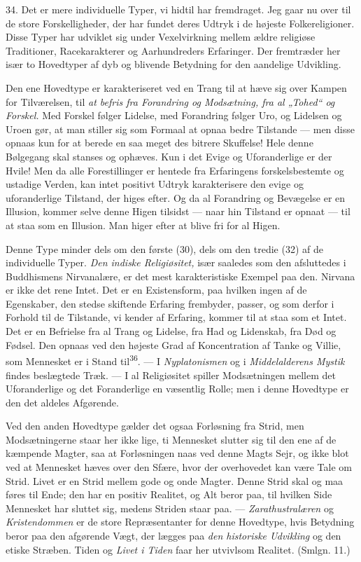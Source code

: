 \documentclass[12pt,a4paper,openany]{book}
\newcommand{\opage}[1]{\marginnote{\footnotesize\textit{[#1]}}}
\begin{document}
34. Det er mere individuelle Typer, vi hidtil har fremdraget. Jeg gaar
nu over til de store Forskelligheder, der har fundet deres Udtryk i de
højeste Folkereligioner. Disse Typer har udviklet sig under
Vexelvirkning mellem ældre religiøse Traditioner, Racekarakterer og
Aarhundreders Erfaringer. Der fremtræder her især to Hovedtyper af dyb
og blivende Betydning for den aandelige Udvikling.

Den ene Hovedtype er karakteriseret ved en Trang til at hæve sig over
Kampen for Tilværelsen, til \textit{at befris fra Forandring og
Modsætning, fra al „Tohed“ og Forskel.} Med Forskel følger Lidelse, med
Forandring følger Uro, og Lidelsen og Uroen gør, at man stiller sig som
Formaal at opnaa bedre Tilstande --- men disse opnaas kun for at berede
en saa meget des bitrere Skuffelse! Hele denne Bølgegang skal stanses og
ophæves. Kun i det Evige og Uforanderlige er der Hvile! Men da alle
Forestillinger er hentede fra Erfaringens forskelsbestemte og ustadige
Verden, kan intet positivt Udtryk karakterisere den evige og
uforanderlige Tilstand, der higes efter. Og da al Forandring og
Bevægelse er en Illusion, kommer selve denne Higen tilsidst --- naar hin
Tilstand er opnaat --- til at staa som en Illusion. Man higer efter at
blive fri for al Higen.

Denne Type minder dels om den første (30), dels om den tredie (32) af de
individuelle Typer. \textit{Den indiske Religiøsitet,} især saaledes som
den afsluttedes i Buddhismens Nirvanalære, er det mest karakteristiske
Exempel paa den. Nirvana er ikke det rene Intet. Det er en Existensform,
paa hvilken ingen af de Egenskaber, den stedse skiftende Erfaring
frembyder, passer, og som
\opage{82}derfor i Forhold til de Tilstande, vi kender af Erfaring,
kommer til at staa som et Intet. Det er en Befrielse fra al Trang og
Lidelse, fra Had og Lidenskab, fra Død og Fødsel. Den opnaas ved den
højeste Grad af Koncentration af Tanke og Villie, som Mennesket er i
Stand til\textsuperscript{36}. --- I \textit{Nyplatonismen} og i
\textit{Middelalderens Mystik} findes beslægtede Træk. --- I al
Religiøsitet spiller Modsætningen mellem det Uforanderlige og det
Foranderlige en væsentlig Rolle; men i denne Hovedtype er den det
aldeles Afgørende.

Ved den anden Hovedtype gælder det ogsaa Forløsning fra Strid, men
Modsætningerne staar her ikke lige, ti Mennesket slutter sig til den ene
af de kæmpende Magter, saa at Forløsningen naas ved denne Magts Sejr, og
ikke blot ved at Mennesket hæves over den Sfære, hvor der overhovedet
kan være Tale om Strid. Livet er en Strid mellem gode og onde Magter.
Denne Strid skal og maa føres til Ende; den har en positiv Realitet, og
Alt beror paa, til hvilken Side Mennesket har sluttet sig, medens
Striden staar paa. --- \textit{Zarathustralæren} og
\textit{Kristendommen} er de store Repræsentanter for denne Hovedtype,
hvis Betydning beror paa den afgørende Vægt, der lægges paa \textit{den
historiske Udvikling} og den etiske Stræben. Tiden og \textit{Livet i
Tiden} faar her utvivlsom Realitet. (Smlgn. 11.)
\end{document}
